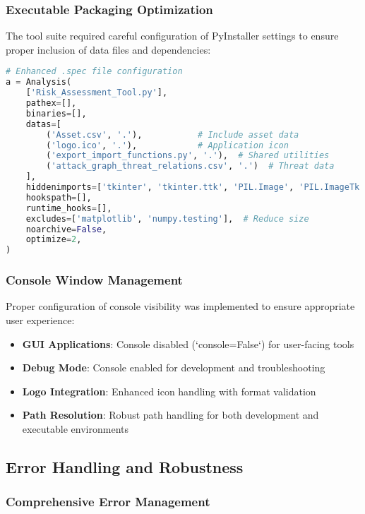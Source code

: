 \documentclass[binding=0.6cm]{sapthesis}
\begin{document}
\subsubsection{Executable Packaging Optimization}

The tool suite required careful configuration of PyInstaller settings to ensure proper inclusion of data files and dependencies:

\begin{lstlisting}[language=Python, caption=Enhanced PyInstaller Configuration]
# Enhanced .spec file configuration
a = Analysis(
    ['Risk_Assessment_Tool.py'],
    pathex=[],
    binaries=[],
    datas=[
        ('Asset.csv', '.'),           # Include asset data
        ('logo.ico', '.'),            # Application icon
        ('export_import_functions.py', '.'),  # Shared utilities
        ('attack_graph_threat_relations.csv', '.')  # Threat data
    ],
    hiddenimports=['tkinter', 'tkinter.ttk', 'PIL.Image', 'PIL.ImageTk'],
    hookspath=[],
    runtime_hooks=[],
    excludes=['matplotlib', 'numpy.testing'],  # Reduce size
    noarchive=False,
    optimize=2,
)
\end{lstlisting}

\subsubsection{Console Window Management}

Proper configuration of console visibility was implemented to ensure appropriate user experience:

\begin{itemize}
    \item \textbf{GUI Applications}: Console disabled (`console=False`) for user-facing tools
    \item \textbf{Debug Mode}: Console enabled for development and troubleshooting
    \item \textbf{Logo Integration}: Enhanced icon handling with format validation
    \item \textbf{Path Resolution}: Robust path handling for both development and executable environments
\end{itemize}

\subsection{Error Handling and Robustness}

\subsubsection{Comprehensive Error Management}
\end{document}
